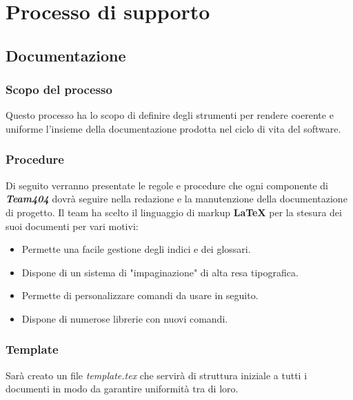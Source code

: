\documentclass[a4paper,11pt]{article}
\begin{document}
\begin{fixpic}
\begin{minipage}[t]{0.45\linewidth}
  \label{gfx/image}
\end{minipage}
\end{fixpic}
		
	\section{Processo di supporto}
		\subsection{Documentazione}
		
			\subsubsection{Scopo del processo}
			Questo processo ha lo scopo di definire degli strumenti per rendere coerente e uniforme l'insieme della documentazione prodotta nel ciclo di vita del software.
			
			\subsubsection{Procedure}
			Di seguito verranno presentate le regole e procedure che ogni componente di \textbf{\emph{Team404}} dovrà seguire nella redazione e la manutenzione  della documentazione di progetto. Il team ha scelto il linguaggio di markup \textbf{\LaTeX} per la  stesura dei suoi documenti per vari motivi:
			\begin{itemize}
			\item Permette una facile gestione degli indici e dei glossari.
			\item Dispone di  un sistema di "impaginazione" di alta resa tipografica.
			\item Permette di personalizzare comandi da usare in seguito.
			\item Dispone di numerose librerie con nuovi comandi.
	\end{itemize}		 
			\subsubsection{Template}
			Sarà creato un file \textit{template.tex}  che servirà di struttura iniziale a tutti i documenti in modo da garantire uniformità tra di loro.
\end{document}
